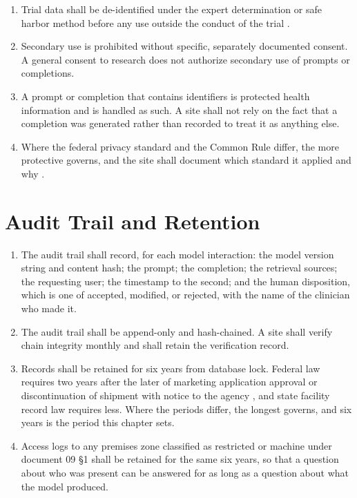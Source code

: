 \begin{enumerate}
\item Trial data shall be de-identified under the expert determination or safe
  harbor method before any use outside the conduct of the trial
  \cite{cfr45part164}.

\item Secondary use is prohibited without specific, separately documented
  consent. A general consent to research does not authorize secondary use of
  prompts or completions.

\item A prompt or completion that contains identifiers is protected health
  information and is handled as such. A site shall not rely on the fact that a
  completion was generated rather than recorded to treat it as anything else.

\item Where the federal privacy standard and the Common Rule differ, the more
  protective governs, and the site shall document which standard it applied and
  why \cite{cfr45part164,cfr45part46}.
\end{enumerate}

\section{Audit Trail and Retention}

\begin{enumerate}
\item The audit trail shall record, for each model interaction: the model
  version string and content hash; the prompt; the completion; the retrieval
  sources; the requesting user; the timestamp to the second; and the human
  disposition, which is one of accepted, modified, or rejected, with the name of
  the clinician who made it.

\item The audit trail shall be append-only and hash-chained. A site shall
  verify chain integrity monthly and shall retain the verification record.

\item Records shall be retained for six years from database lock. Federal law
  requires two years after the later of marketing application approval or
  discontinuation of shipment with notice to the agency \cite{cfr312}, and state
  facility record law requires less. Where the periods differ, the longest
  governs, and six years is the period this chapter sets.

\item Access logs to any premises zone classified as restricted or machine under
  document 09 §1 shall be retained for the same six years, so that a question
  about who was present can be answered for as long as a question about what the
  model produced.
\end{enumerate}


